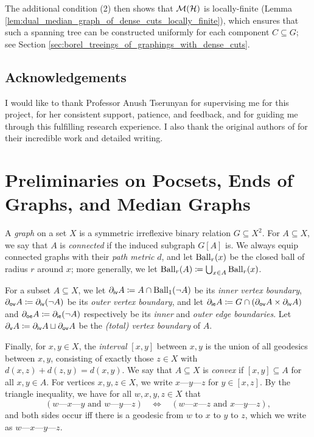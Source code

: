 \documentclass[reqno]{amsart}
\begin{document}
    The additional condition (2) then shows that $\mathcal{M}(\mathcal{H})$ is locally-finite (Lemma \ref{lem:dual_median_graph_of_dense_cuts_locally_finite}), which ensures that such a spanning tree can be constructed uniformly for each component $C\subseteq G$; see Section \ref{sec:borel_treeings_of_graphings_with_dense_cuts}.

    \subsection*{Acknowledgements}

    I would like to thank Professor Anush Tserunyan for supervising me for this project, for her consistent support, patience, and feedback, and for guiding me through this fulfilling research experience. I also thank the original authors of \cite{CPTT23} for their incredible work and detailed writing.

    \section{Preliminaries on Pocsets, Ends of Graphs, and Median Graphs}\label{sec:preliminaries}
    \renewcommand{\-}{\textrm{---}}

    \begin{notation*}
        A \textit{graph} on a set $X$ is a symmetric irreflexive binary relation $G\subseteq X^2$. For $A\subseteq X$, we say that $A$ is \textit{connected} if the induced subgraph $G[A]$ is. We always equip connected graphs with their \textit{path metric} $d$, and let $\operatorname{Ball}_r(x)$ be the closed ball of radius $r$ around $x$; more generally, we let $\operatorname{Ball}_r(A)\coloneqq\bigcup_{x\in A}\operatorname{Ball}_r(x)$.

        For a subset $A\subseteq X$, we let $\partial_\mathsf{iv}A\coloneqq A\cap\operatorname{Ball}_1(\lnot A)$ be its \textit{inner vertex boundary}, $\partial_\mathsf{ov}A\coloneqq\partial_\mathsf{iv}(\lnot A)$ be its \textit{outer vertex boundary}, and let $\partial_\mathsf{ie}A\coloneqq G\cap(\partial_\mathsf{ov}A\times\partial_\mathsf{iv}A)$ and $\partial_\mathsf{oe}A\coloneqq\partial_\mathsf{ie}(\lnot A)$ respectively be its \textit{inner} and \textit{outer edge boundaries}. Let $\partial_\mathsf{v}A\coloneqq\partial_\mathsf{iv}A\sqcup\partial_\mathsf{ov}A$ be the \textit{(total) vertex boundary} of $A$.

        Finally, for $x,y\in X$, the \textit{interval} $[x,y]$ between $x,y$ is the union of all geodesics between $x,y$, consisting of exactly those $z\in X$ with $d(x,z)+d(z,y)=d(x,y)$. We say that $A\subseteq X$ is \textit{convex} if $[x,y]\subseteq A$ for all $x,y\in A$. For vertices $x,y,z\in X$, we write $x\-y\-z$ for $y\in[x,z]$. By the triangle inequality, we have for all $w,x,y,z\in X$ that
        \begin{equation*}
            (w\-x\-y\textrm{ and }w\-y\-z)\ \ \ \ \Leftrightarrow\ \ \ \ (w\-x\-z\textrm{ and }x\-y\-z),
        \end{equation*}
        and both sides occur iff there is a geodesic from $w$ to $x$ to $y$ to $z$, which we write as $w\-x\-y\-z$.
    \end{notation*}
\end{document}
